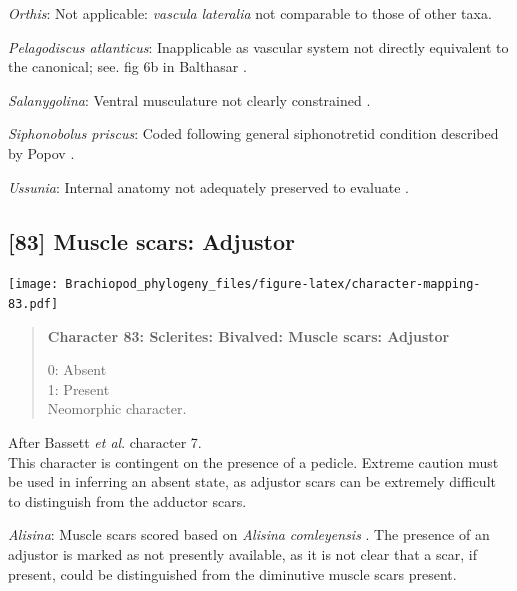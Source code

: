 \documentclass[openany]{book}
\begin{document}
\hypertarget{Orthis-coding-82}{}
\emph{Orthis}: Not applicable: \emph{vascula} \emph{lateralia} not
comparable to those of other taxa.

\hypertarget{Pelagodiscus_atlanticus-coding-82}{}
\emph{Pelagodiscus atlanticus}: Inapplicable as vascular system not
directly equivalent to the canonical; see. fig 6b in Balthasar
\citeyearpar{Balthasar2009Thebrachiopod}.

\hypertarget{Salanygolina-coding-82}{}
\emph{Salanygolina}: Ventral musculature not clearly constrained
\citep{Holmer2009Theenigmatic}.

\hypertarget{Siphonobolus_priscus-coding-82}{}
\emph{Siphonobolus priscus}: Coded following general siphonotretid
condition described by Popov \citeyearpar[p.~407]{Popov1992TheCambrian}.

\hypertarget{Ussunia-coding-82}{}
\emph{Ussunia}: Internal anatomy not adequately preserved to evaluate
\citep{Nikitin1984}.

\subsection*{{[}83{]} Muscle scars:
Adjustor}\label{muscle-scars-adjustor}

\texttt{[image: Brachiopod\_phylogeny\_files/figure-latex/character-mapping-83.pdf]}

\begin{quote}
\textbf{Character 83: Sclerites: Bivalved: Muscle scars: Adjustor}

0: Absent\\
1: Present\\
Neomorphic character.
\end{quote}

After Bassett \emph{et al}.
\citeyearpar{Bassett2001Functionalmorphology} character 7.\\
This character is contingent on the presence of a pedicle. Extreme
caution must be used in inferring an absent state, as adjustor scars can
be extremely difficult to distinguish from the adductor scars.

\hypertarget{Alisina-coding-83}{}
\emph{Alisina}: Muscle scars scored based on \emph{Alisina}
\emph{comleyensis} \citep{Bassett2001Functionalmorphology}. The presence
of an adjustor is marked as not presently available, as it is not clear
that a scar, if present, could be distinguished from the diminutive
muscle scars present.
\end{document}

